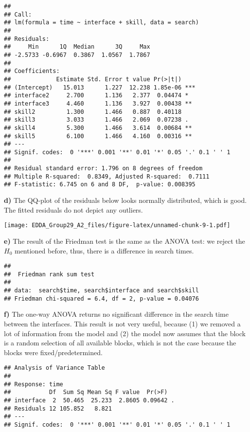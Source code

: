 \documentclass[]{article}
\begin{document}
\begin{verbatim}
## 
## Call:
## lm(formula = time ~ interface + skill, data = search)
## 
## Residuals:
##     Min      1Q  Median      3Q     Max 
## -2.5733 -0.6967  0.3867  1.0567  1.7867 
## 
## Coefficients:
##             Estimate Std. Error t value Pr(>|t|)    
## (Intercept)   15.013      1.227  12.238 1.85e-06 ***
## interface2     2.700      1.136   2.377  0.04474 *  
## interface3     4.460      1.136   3.927  0.00438 ** 
## skill2         1.300      1.466   0.887  0.40118    
## skill3         3.033      1.466   2.069  0.07238 .  
## skill4         5.300      1.466   3.614  0.00684 ** 
## skill5         6.100      1.466   4.160  0.00316 ** 
## ---
## Signif. codes:  0 '***' 0.001 '**' 0.01 '*' 0.05 '.' 0.1 ' ' 1
## 
## Residual standard error: 1.796 on 8 degrees of freedom
## Multiple R-squared:  0.8349, Adjusted R-squared:  0.7111 
## F-statistic: 6.745 on 6 and 8 DF,  p-value: 0.008395
\end{verbatim}

\textbf{d)} The QQ-plot of the residuals below looks normally
distributed, which is good. The fitted residuals do not depict any
outliers.

\texttt{[image: EDDA\_Group29\_A2\_files/figure-latex/unnamed-chunk-9-1.pdf]}

\textbf{e)} The result of the Friedman test is the same as the ANOVA
test: we reject the \(H_0\) mentioned before, thus, there is a
difference in search times.

\begin{verbatim}
## 
##  Friedman rank sum test
## 
## data:  search$time, search$interface and search$skill
## Friedman chi-squared = 6.4, df = 2, p-value = 0.04076
\end{verbatim}

\textbf{f)} The one-way ANOVA returns no significant difference in the
search time between the interfaces. This result is not very useful,
because (1) we removed a lot of information from the model and (2) the
model now assumes that the block is a random selection of all available
blocks, which is not the case because the blocks were
fixed/predetermined.

\begin{verbatim}
## Analysis of Variance Table
## 
## Response: time
##           Df  Sum Sq Mean Sq F value  Pr(>F)  
## interface  2  50.465  25.233  2.8605 0.09642 .
## Residuals 12 105.852   8.821                  
## ---
## Signif. codes:  0 '***' 0.001 '**' 0.01 '*' 0.05 '.' 0.1 ' ' 1
\end{verbatim}
\end{document}
